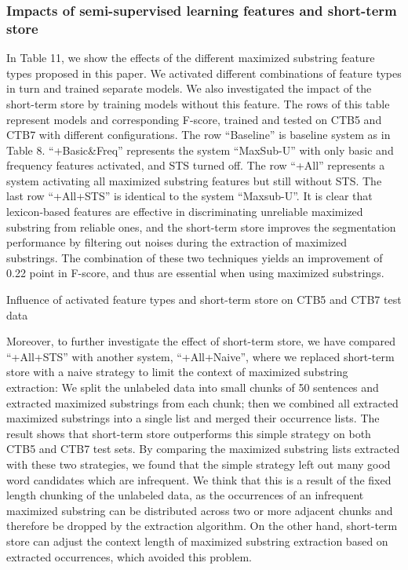 \documentclass[english]{jnlp_1.4}
\begin{document}
\subsubsection{Impacts of semi-supervised learning features and short-term store}

In Table 11, we show the effects of the different maximized substring feature types proposed in this paper. We activated different combinations of feature types in turn and trained separate models. We also investigated the impact of the short-term store by training models without this feature. The rows of this table represent models and corresponding F-score, trained and tested on CTB5 and CTB7 with different configurations. The row ``Baseline'' is baseline system as in Table 8. ``+Basic\&Freq'' represents the system ``MaxSub-U'' with only basic and frequency features activated, and STS turned off. The row ``+All'' represents a system activating all maximized substring features but still without STS. The last row ``+All+STS'' is identical to the system ``Maxsub-U''. It is clear that lexicon-based features are effective in discriminating unreliable maximized substring from reliable ones, and the short-term store improves the segmentation performance by filtering out noises during the extraction of maximized substrings. The combination of these two techniques yields an improvement of 0.22 point in F-score, and thus are essential when using maximized substrings.

\begin{table}[b]
\vspace*{-0.75\Cvs}
\caption{Influence of activated feature types and short-term store on CTB5 and CTB7 test data}

\end{table}

Moreover, to further investigate the effect of short-term store, we have compared ``+All+STS'' with another system, ``+All+Naive'', where we replaced short-term store with a naive strategy to limit the context of maximized substring extraction: We split the unlabeled data into small chunks of 50 sentences and extracted maximized substrings from each chunk; then we combined all extracted maximized substrings into a single list and merged their occurrence lists. The result shows that short-term store outperforms this simple strategy on both CTB5 and CTB7 test sets. By comparing the maximized substring lists extracted with these two strategies, we found that the simple strategy left out many good word candidates which are infrequent. We think that this is a result of the fixed length chunking of the unlabeled data, as the occurrences of an infrequent maximized substring can be distributed across two or more adjacent chunks and therefore be dropped by the extraction algorithm. On the other hand, short-term store can adjust the context length of maximized substring extraction based on extracted occurrences, which avoided this problem.
\end{document}
